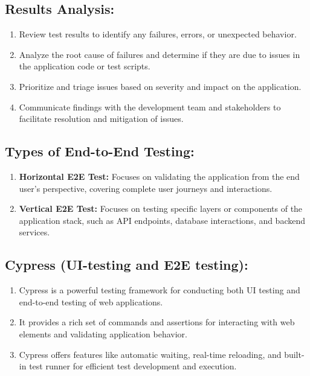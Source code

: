 \documentclass{article}
\begin{document}
\subsection{Results Analysis:}
\begin{enumerate}[label=\arabic*.]
    \item Review test results to identify any failures, errors, or unexpected behavior.
    \item Analyze the root cause of failures and determine if they are due to issues in the application code or test scripts.
    \item Prioritize and triage issues based on severity and impact on the application.
    \item Communicate findings with the development team and stakeholders to facilitate resolution and mitigation of issues.
\end{enumerate}

\subsection{Types of End-to-End Testing:}
\begin{enumerate}[label=\arabic*.]
    \item \textbf{Horizontal E2E Test:} Focuses on validating the application from the end user's perspective, covering complete user journeys and interactions.
    \item \textbf{Vertical E2E Test:} Focuses on testing specific layers or components of the application stack, such as API endpoints, database interactions, and backend services.
\end{enumerate}

\subsection{Cypress (UI-testing and E2E testing):}
\begin{enumerate}[label=\arabic*.]
    \item Cypress is a powerful testing framework for conducting both UI testing and end-to-end testing of web applications.
    \item It provides a rich set of commands and assertions for interacting with web elements and validating application behavior.
    \item Cypress offers features like automatic waiting, real-time reloading, and built-in test runner for efficient test development and execution.
\end{enumerate}
\end{document}
